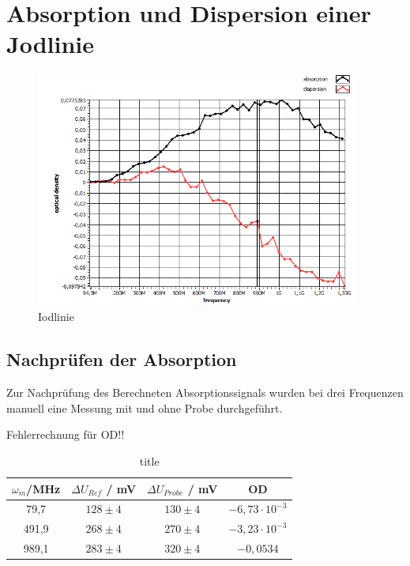 
\section{Absorption und Dispersion einer Jodlinie}


\begin{figure}[h]
    \centering
    \includegraphics[width=0.95\textwidth]{Bilder/Jodlinie/Gruppe32020Iododgraph1 Kopie.png}
    \caption[Iodlinie]{Iodlinie}
\end{figure}

\subsection{Nachprüfen der Absorption}

Zur Nachprüfung des Berechneten Absorptionssignals wurden bei drei Frequenzen manuell eine Messung mit und ohne Probe durchgeführt.

Fehlerrechnung für OD!!
\begin{table}[h]
    \centering
    \begin{tabular}{c|cc|c}
        $\omega_m$/MHz & $\Delta U_{Ref}$ / mV & $\Delta U_{Probe}$ / mV & OD \\ \hline
        79,7 & $128 \pm 4$ & $130 \pm 4$ & $-6,73 \cdot 10^{-3}$ \\
        491,9 & $268 \pm 4$ & $270 \pm 4$ & $-3,23 \cdot 10^{-3}$ \\
        989,1 & $283 \pm 4$ & $320 \pm 4$ & $-0,0534$ \\
    \end{tabular}
    \caption[short]{title}
\end{table}